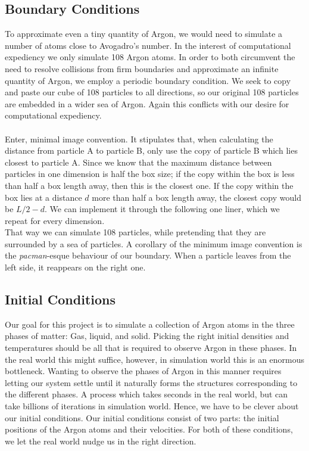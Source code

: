 \documentclass{IAYCPro}
\begin{document}
\subsection{Boundary Conditions}
To approximate even a tiny quantity of Argon, we would need to simulate a number of atoms close to Avogadro's number. In the interest of computational expediency we only simulate 108 Argon atoms. In order to both circumvent the need to resolve collisions from firm boundaries and approximate an infinite quantity of Argon, we employ a periodic boundary condition. We seek to copy and paste our cube of 108 particles to all directions, so our original 108 particles are embedded in a wider sea of Argon. Again this conflicts with our desire for computational expediency. \\ \\
Enter, minimal image convention. It stipulates that, when calculating the distance from particle A to particle B, only use the copy of particle B which lies closest to particle A. Since we know that the maximum distance between particles in one dimension is half the box size; if the copy within the box is less than half a box length away, then this is the closest one. If the copy within the box lies at a distance $d$ more than half a box length away, the closest copy would be $L/2 - d$. We can implement it through the following one liner, which we repeat for every dimension.
\\
 
That way we can simulate 108 particles, while pretending that they are surrounded by a sea of particles. A corollary of the minimum image convention is the \textit{pacman}-esque behaviour of our boundary. When a particle leaves from the left side, it reappears on the right one.

\subsection{Initial Conditions}

Our goal for this project is to simulate a collection of Argon atoms in the three phases of matter: Gas, liquid, and solid. Picking the right initial densities and temperatures should be all that is required to observe Argon in these phases. In the real world this might suffice, however, in simulation world this is an enormous bottleneck. Wanting to observe the phases of Argon in this manner requires letting our system settle until it naturally forms the structures corresponding to the different phases. A process which takes seconds in the real world, but can take billions of iterations in simulation world. Hence, we have to be clever about our initial conditions. Our initial conditions consist of two parts: the initial positions of the Argon atoms and their velocities. For both of these conditions, we let the real world nudge us in the right direction. 
\end{document}
